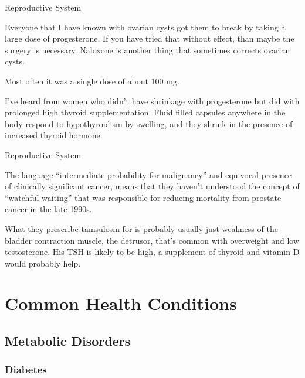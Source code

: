 \documentclass[11pt,oneside,openany,extrafontsizes]{memoir}
\begin{document}
\begin{standalonequote}{Reproductive System}

    \begin{answer}
		Everyone that I have known with ovarian cysts got them to break by taking a large dose of progesterone. If you have tried that without effect, than maybe the surgery is necessary. Naloxone is another thing that sometimes corrects ovarian cysts.

		Most often it was a single dose of about 100 mg.

		I've heard from women who didn't have shrinkage with progesterone but did with prolonged high thyroid supplementation. Fluid filled capsules anywhere in the body respond to hypothyroidism by swelling, and they shrink in the presence of increased thyroid hormone.
    \end{answer}
\end{standalonequote}

\begin{standalonequote}{Reproductive System}

    \begin{answer}
		The language \enquote{intermediate probability for malignancy} and equivocal presence of clinically significant cancer, means that they haven't understood the concept of \enquote{watchful waiting} that was responsible for reducing mortality from prostate cancer in the late 1990s.

		What they prescribe tamsulosin for is probably usually just weakness of the bladder contraction muscle, the detrusor, that's common with overweight and low testosterone. His TSH is likely to be high, a supplement of thyroid and vitamin D would probably help.
    \end{answer}
\end{standalonequote}

\chapter{Common Health Conditions}

\section{Metabolic Disorders}
\subsection{Diabetes}
\end{document}
